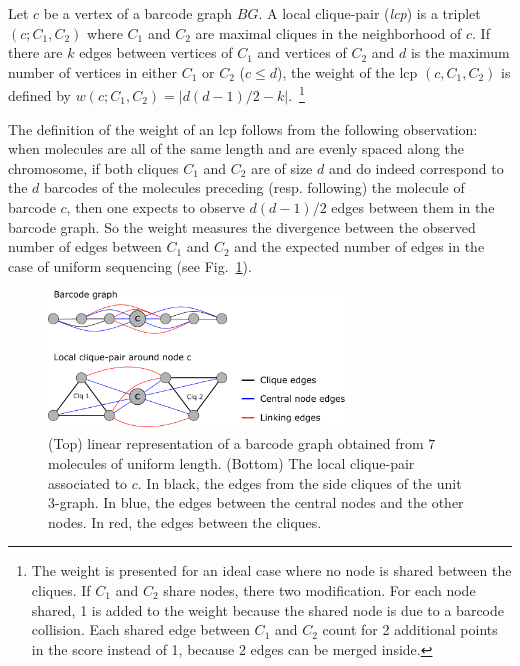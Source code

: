\begin{definition}
    \label{def:lcp}
    Let $c$ be a vertex of a barcode graph $BG$. A local clique-pair (\textit{lcp}) is a triplet $(c;C_1,C_2)$ where $C_1$ and $C_2$ are maximal cliques in the neighborhood of $c$. If there are $k$ edges between vertices of $C_1$ and vertices of $C_2$ and $d$ is the maximum number of vertices in either $C_1$ or $C_2$ ($c\leq d$), the weight of the lcp $(c,C_1,C_2)$ is  defined by $w(c;C_1,C_2)=|d(d-1)/2 - k|$.~\footnote{The weight is presented for an ideal case where no node is shared between the cliques. If $C_1$ and $C_2$ share nodes, there two modification. For each node shared, 1 is added to the weight because the shared node is due to a barcode collision. Each shared edge between $C_1$ and $C_2$ count for 2 additional points in the score instead of 1, because 2 edges can be merged inside.}
\end{definition}

The definition of the weight of an lcp follows from the following observation: when molecules are all of the same length and are evenly spaced along the chromosome, if both cliques  $C_1$ and $C_2$ are of size $d$ and do indeed correspond to the $d$ barcodes of the molecules preceding (resp. following) the molecule of barcode $c$, then one expects to observe $d(d-1)/2$ edges between them in the barcode graph. So the weight measures the divergence between the observed number of edges between $C_1$ and $C_2$ and the expected number of edges in the case of uniform sequencing (see Fig.~\ref{fig:perfect_udg}).

\begin{figure}[htp]
    \centering
    \includegraphics[width=0.7\textwidth]{lcp_2.pdf} %
    \caption{(Top) linear representation of a barcode graph obtained from $7$ molecules of uniform length. (Bottom) The local clique-pair associated to $c$. In black, the edges from the side cliques of the unit 3-graph. In blue, the edges between the central nodes and the other nodes. In red, the edges between the cliques.}
    \label{fig:perfect_udg}
\end{figure}


